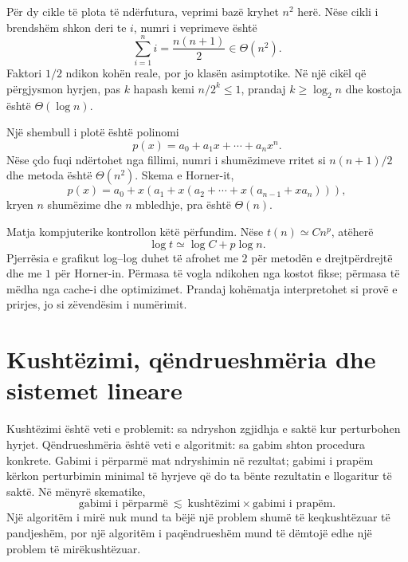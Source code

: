 \documentclass[11pt,oneside,openany]{book}
\begin{document}
Për dy cikle të plota të ndërfutura, veprimi bazë kryhet $n^2$ herë. Nëse
cikli i brendshëm shkon deri te $i$, numri i veprimeve është
\begin{equation}
 \sum_{i=1}^{n}i=\frac{n(n+1)}{2}\in\Theta(n^2).
\end{equation}
Faktori $1/2$ ndikon kohën reale, por jo klasën asimptotike. Në një cikël që
përgjysmon hyrjen, pas $k$ hapash kemi $n/2^k\leq1$, prandaj
$k\geq\log_2n$ dhe kostoja është $\Theta(\log n)$.

Një shembull i plotë është polinomi
\begin{equation}
 p(x)=a_0+a_1x+\cdots+a_nx^n.
\end{equation}
Nëse çdo fuqi ndërtohet nga fillimi, numri i shumëzimeve rritet si
$n(n+1)/2$ dhe metoda është $\Theta(n^2)$. Skema e Horner-it,
\begin{equation}
 p(x)=a_0+x\left(a_1+x\left(a_2+\cdots+x(a_{n-1}+xa_n)\right)\right),
\end{equation}
kryen $n$ shumëzime dhe $n$ mbledhje, pra është $\Theta(n)$.

Matja kompjuterike kontrollon këtë përfundim. Nëse
$t(n)\simeq Cn^p$, atëherë
\begin{equation}
 \log t\simeq\log C+p\log n.
\end{equation}
Pjerrësia e grafikut log--log duhet të afrohet me $2$ për metodën e
drejtpërdrejtë dhe me $1$ për Horner-in. Përmasa të vogla ndikohen nga kostot
fikse; përmasa të mëdha nga cache-i dhe optimizimet. Prandaj kohëmatja
interpretohet si provë e prirjes, jo si zëvendësim i numërimit.

\section{Kushtëzimi, qëndrueshmëria dhe sistemet lineare}
Kushtëzimi është veti e problemit: sa ndryshon zgjidhja e saktë kur
perturbohen hyrjet. Qëndrueshmëria është veti e algoritmit: sa gabim shton
procedura konkrete. Gabimi i përparmë mat ndryshimin në rezultat; gabimi i
prapëm kërkon perturbimin minimal të hyrjeve që do ta bënte rezultatin e
llogaritur të saktë. Në mënyrë skematike,
\begin{equation}
 \text{gabimi i përparmë}\ \lesssim\
 \text{kushtëzimi}\times\text{gabimi i prapëm}.
\end{equation}
Një algoritëm i mirë nuk mund ta bëjë një problem shumë të keqkushtëzuar
të pandjeshëm, por një algoritëm i paqëndrueshëm mund të dëmtojë edhe një
problem të mirëkushtëzuar.
\end{document}

